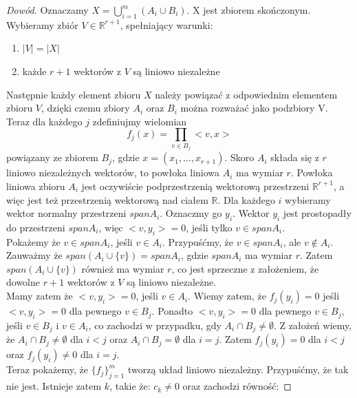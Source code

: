 \documentclass[12pt,a4paper]{article}
\begin{document}
\begin{proof}[Dow\'od]\cite{5}
Oznaczamy $X=\bigcup_{i=1}^{m} (A_i \cup B_{i})$. X jest zbiorem sko\'nczonym. Wybieramy zbi\'or $V\in\mathbb{R}^{r+1}$, spe{\l}niaj\k{a}cy warunki: 
\begin{enumerate}[1)]
\item $|V|=|X|$ 
\item ka\.zde $r+1$ wektor\'ow z $V$ s\k{a} liniowo niezale\.zne
\end{enumerate}
 Nast\k{e}pnie ka\.zdy element zbioru $X$ nale\.zy powi\k{a}za\'c z odpowiednim elementem zbioru $V$, dzi\k{e}ki czemu zbiory $A_{i}$ oraz $B_{i}$ mo\.zna rozwa\.za\'c jako podzbiory V. Teraz dla ka\.zdego $j$ zdefiniujmy wielomian 
\begin{equation}
f_{j}(x)=\prod_{v\in B_{j}}<v,x> 
\end{equation}
 powi\k{a}zany ze zbiorem $B_{j}$, gdzie $x=(x_{1},\ldots,x_{r+1})$. Skoro $A_{i}$ sk{\l}ada si\k{e} z $r$ liniowo niezale\.znych wektor\'ow, to pow{\l}oka liniowa $A_{i}$ ma wymiar $r$. Pow{\l}oka liniowa zbioru $A_{i}$ jest oczywi\'scie podprzestrzeni\k{a} wektorow\k{a} przestrzeni $\mathbb{R}^{r+1}$, a wi\k{e}c jest te\.z przestrzeni\k{a} wektorow\k{a} nad cia{\l}em $\mathbb{R}$.  Dla ka\.zdego $i$ wybieramy wektor normalny przestrzeni $spanA_{i}$. Oznaczmy go $y_{i}$. Wektor $y_{i}$ jest prostopad{\l}y do przestrzeni $spanA_{i}$, wi\k{e}c $<v,y_{i}>=0$, je\'sli tylko $v\in spanA_{i}$.\\ 
Poka\.zemy \.ze $v\in spanA_{i}$, je\'sli $v\in A_{i}$. Przypu\'s\'cmy, \.ze $v\in spanA_{i}$, ale $v\notin A_{i}$. Zauwa\.zmy \.ze $span(A_{i}\cup\{v\})=spanA_{i}$, gdzie $spanA_{i}$ ma wymiar $r$. Zatem $span(A_{i}\cup\{v\})$ r\'ownie\.z ma wymiar $r$, co jest sprzeczne z za{\l}o\.zeniem, \.ze dowolne $r+1$ wektor\'ow z $V$ s\k{a} liniowo niezale\.zne. \\
Mamy zatem \.ze $<v,y_{i}>=0$, je\'sli $v\in A_{i}$. Wiemy zatem, \.ze $f_j(y_{i})=0$ je\'sli $<v,y_{i}>=0$ dla pewnego $v\in B_{j}$. Ponadto $<v,y_{i}>=0$ dla pewnego $v\in B_{j}$, je\'sli $v\in B_{j}$ i $v\in A_{i}$, co zachodzi w przypadku, gdy $A_{i}\cap B_{j}\neq\emptyset$. Z za{\l}o\.ze\'n wiemy, \.ze $A_{i}\cap B_{j}\neq\emptyset$ dla $i<j$ oraz $A_{i}\cap B_{j}=\emptyset$ dla $i=j$. Zatem $f_{j}(y_{i})=0$ dla $i<j$ oraz $f_{j}(y_{i})\neq0$ dla $i=j$. \\
Teraz poka\.zemy, \.ze $\{f_{j}\}_{j=1}^{m}$ tworz\k{a} uk{\l}ad liniowo niezale\.zny. Przypu\'s\'cmy, \.ze tak nie jest. Istnieje zatem $k$, takie \.ze: $c_{k}\neq0$ oraz zachodzi r\'owno\'s\'c: 

\end{proof}
\end{document}

